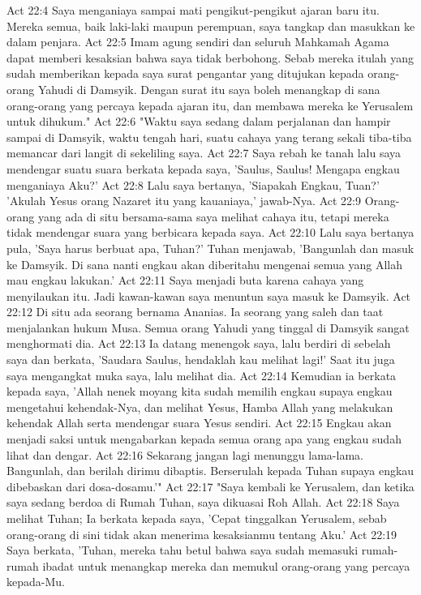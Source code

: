 Act 22:4  Saya menganiaya sampai mati pengikut-pengikut ajaran baru itu. Mereka semua, baik laki-laki maupun perempuan, saya tangkap dan masukkan ke dalam penjara.
Act 22:5  Imam agung sendiri dan seluruh Mahkamah Agama dapat memberi kesaksian bahwa saya tidak berbohong. Sebab mereka itulah yang sudah memberikan kepada saya surat pengantar yang ditujukan kepada orang-orang Yahudi di Damsyik. Dengan surat itu saya boleh menangkap di sana orang-orang yang percaya kepada ajaran itu, dan membawa mereka ke Yerusalem untuk dihukum."
Act 22:6  "Waktu saya sedang dalam perjalanan dan hampir sampai di Damsyik, waktu tengah hari, suatu cahaya yang terang sekali tiba-tiba memancar dari langit di sekeliling saya.
Act 22:7  Saya rebah ke tanah lalu saya mendengar suatu suara berkata kepada saya, 'Saulus, Saulus! Mengapa engkau menganiaya Aku?'
Act 22:8  Lalu saya bertanya, 'Siapakah Engkau, Tuan?' 'Akulah Yesus orang Nazaret itu yang kauaniaya,' jawab-Nya.
Act 22:9  Orang-orang yang ada di situ bersama-sama saya melihat cahaya itu, tetapi mereka tidak mendengar suara yang berbicara kepada saya.
Act 22:10  Lalu saya bertanya pula, 'Saya harus berbuat apa, Tuhan?' Tuhan menjawab, 'Bangunlah dan masuk ke Damsyik. Di sana nanti engkau akan diberitahu mengenai semua yang Allah mau engkau lakukan.'
Act 22:11  Saya menjadi buta karena cahaya yang menyilaukan itu. Jadi kawan-kawan saya menuntun saya masuk ke Damsyik.
Act 22:12  Di situ ada seorang bernama Ananias. Ia seorang yang saleh dan taat menjalankan hukum Musa. Semua orang Yahudi yang tinggal di Damsyik sangat menghormati dia.
Act 22:13  Ia datang menengok saya, lalu berdiri di sebelah saya dan berkata, 'Saudara Saulus, hendaklah kau melihat lagi!' Saat itu juga saya mengangkat muka saya, lalu melihat dia.
Act 22:14  Kemudian ia berkata kepada saya, 'Allah nenek moyang kita sudah memilih engkau supaya engkau mengetahui kehendak-Nya, dan melihat Yesus, Hamba Allah yang melakukan kehendak Allah serta mendengar suara Yesus sendiri.
Act 22:15  Engkau akan menjadi saksi untuk mengabarkan kepada semua orang apa yang engkau sudah lihat dan dengar.
Act 22:16  Sekarang jangan lagi menunggu lama-lama. Bangunlah, dan berilah dirimu dibaptis. Berserulah kepada Tuhan supaya engkau dibebaskan dari dosa-dosamu.'"
Act 22:17  "Saya kembali ke Yerusalem, dan ketika saya sedang berdoa di Rumah Tuhan, saya dikuasai Roh Allah.
Act 22:18  Saya melihat Tuhan; Ia berkata kepada saya, 'Cepat tinggalkan Yerusalem, sebab orang-orang di sini tidak akan menerima kesaksianmu tentang Aku.'
Act 22:19  Saya berkata, 'Tuhan, mereka tahu betul bahwa saya sudah memasuki rumah-rumah ibadat untuk menangkap mereka dan memukul orang-orang yang percaya kepada-Mu.
